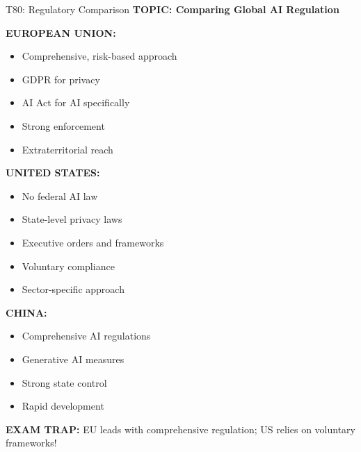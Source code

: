 \documentclass[8pt]{beamer}
\begin{document}
	\begin{frame}{T80: Regulatory Comparison}
		\fontsize{6.5}{7.5}\selectfont
		\textbf{TOPIC: Comparing Global AI Regulation}
		
		\vspace{0.1cm}
		\textbf{EUROPEAN UNION:}
		\begin{itemize}
			\item Comprehensive, risk-based approach
			\item GDPR for privacy
			\item AI Act for AI specifically
			\item Strong enforcement
			\item Extraterritorial reach
		\end{itemize}
		
		\vspace{0.1cm}
		\textbf{UNITED STATES:}
		\begin{itemize}
			\item No federal AI law
			\item State-level privacy laws
			\item Executive orders and frameworks
			\item Voluntary compliance
			\item Sector-specific approach
		\end{itemize}
		
		\vspace{0.1cm}
		\textbf{CHINA:}
		\begin{itemize}
			\item Comprehensive AI regulations
			\item Generative AI measures
			\item Strong state control
			\item Rapid development
		\end{itemize}
		
		\textcolor{myred}{\textbf{EXAM TRAP:}} EU leads with \textcolor{myblue}{comprehensive regulation}; US relies on \textcolor{myblue}{voluntary frameworks}!
	\end{frame}
	
	
\end{document}
